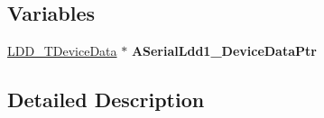 \subsection*{Variables}
\begin{DoxyCompactItemize}
\item 
\mbox{\label{group___terminal__module_ga19d4b715e209f6228d76c65b3d3e13b1}} 
\hyperlink{group___p_e___types__module_gac5cf1362f1f0e3a2ce71b1bf2276d091}{L\+D\+D\+\_\+\+T\+Device\+Data} $\ast$ {\bfseries A\+Serial\+Ldd1\+\_\+\+Device\+Data\+Ptr}
\end{DoxyCompactItemize}


\subsection{Detailed Description}
